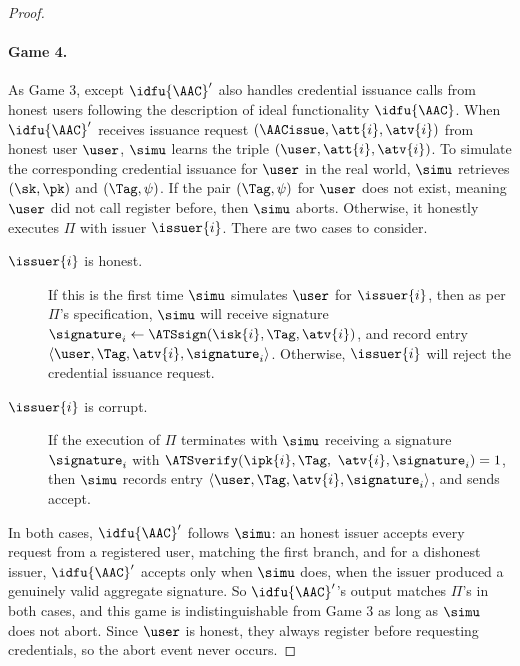 \begin{proof}
  \paragraph{Game 4.} As Game 3, except $\idfu{\AAC}'$ also handles credential
issuance calls from honest users following the description of ideal
functionality $\idfu{\AAC}$.  When  $\idfu{\AAC}'$ receives issuance request
$(\AACissue, \att{i}, \atv{i})$ from honest user $\user$, $\simu$ learns the
triple $(\user, \att{i}, \atv{i})$.  To simulate the corresponding credential
issuance for $\user$ in the real world, $\simu$ retrieves $(\sk, \pk)$ and
$(\Tag, \psi)$.  If the pair $(\Tag, \psi)$ for $\user$ does not exist, meaning
$\user$ did not call register before, then $\simu$ aborts. Otherwise, it
honestly executes $\Pi$ with issuer $\issuer{i}$.  There are two cases to
consider.

  \begin{description}

    \item[$\issuer{i}$ is honest.] If this is the first time $\simu$ simulates
$\user$ for $\issuer{i}$, then as per $\Pi$'s specification,  $\simu$ will
receive signature $\signature_i \leftarrow \ATSsign(\isk{i}, \Tag, \atv{i})$,
and record entry $\langle \user, \Tag, \atv{i}, \signature_i \rangle$.
Otherwise, $\issuer{i}$ will reject the credential issuance request.

    \item[$\issuer{i}$ is corrupt.] If the execution of $\Pi$ terminates with
$\simu$ receiving a signature $\signature_i$ with $\ATSverify(\ipk{i}, \Tag,$
$\atv{i}, \signature_i) = 1$, then $\simu$ records entry $\langle \user, \Tag, \atv{i},
\signature_i \rangle$, and sends accept.

  \end{description}

  In both cases, $\idfu{\AAC}'$ follows $\simu$: an honest issuer accepts every
request from a registered user, matching the first branch, and for a dishonest
issuer, $\idfu{\AAC}'$ accepts only when $\simu$ does, when the issuer produced
a genuinely valid aggregate signature.  So $\idfu{\AAC}'$'s output matches
$\Pi$'s in both cases, and this game is indistinguishable from Game 3 as long as
$\simu$ does not abort.  Since $\user$ is honest, they always register
before requesting credentials, so the abort event never occurs.


\end{proof}
